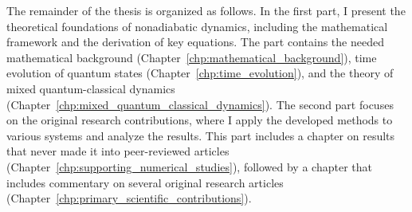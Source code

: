 The remainder of the thesis is organized as follows. In the first part, I present the theoretical foundations of nonadiabatic dynamics, including the mathematical framework and the derivation of key equations. The part contains the needed mathematical background (Chapter~\ref{chp:mathematical_background}), time evolution of quantum states (Chapter~\ref{chp:time_evolution}), and the theory of mixed quantum-classical dynamics (Chapter~\ref{chp:mixed_quantum_classical_dynamics}). The second part focuses on the original research contributions, where I apply the developed methods to various systems and analyze the results. This part includes a chapter on results that never made it into peer-reviewed articles (Chapter~\ref{chp:supporting_numerical_studies}), followed by a chapter that includes commentary on several original research articles (Chapter~\ref{chp:primary_scientific_contributions}).
